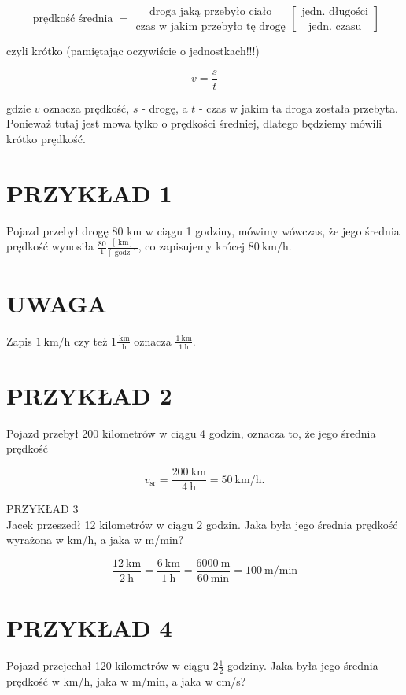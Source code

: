 \documentclass[10pt]{article}
\begin{document}
\[
\text { prędkość średnia }=\frac{\text { droga jaką przebyło ciało }}{\text { czas w jakim przebyło tę drogę }}\left[\frac{\text { jedn. długości }}{\text { jedn. czasu }}\right]
\]

czyli krótko (pamiętając oczywiście o jednostkach!!!)

\[
v=\frac{s}{t}
\]

gdzie \(v\) oznacza prędkość, \(s\) - drogę, a \(t\) - czas w jakim ta droga została przebyta. Ponieważ tutaj jest mowa tylko o prędkości średniej, dlatego będziemy mówili krótko prędkość.

\section*{PRZYKŁAD 1}
Pojazd przebył drogę 80 km w ciągu 1 godziny, mówimy wówczas, że jego średnia prędkość wynosiła \(\frac{80}{1} \frac{[\mathrm{~km}]}{[\operatorname{godz}]}\), co zapisujemy krócej \(80 \mathrm{~km} / \mathrm{h}\).

\section*{UWAGA}
Zapis \(1 \mathrm{~km} / \mathrm{h}\) czy też \(1 \frac{\mathrm{~km}}{\mathrm{~h}}\) oznacza \(\frac{1 \mathrm{~km}}{1 \mathrm{~h}}\).

\section*{PRZYKŁAD 2}
Pojazd przebył 200 kilometrów w ciągu 4 godzin, oznacza to, że jego średnia prędkość

\[
v_{\mathrm{s} \mathrm{r}}=\frac{200 \mathrm{~km}}{4 \mathrm{~h}}=50 \mathrm{~km} / \mathrm{h} .
\]

PRZYKŁAD 3\\
Jacek przeszedł 12 kilometrów w ciągu 2 godzin. Jaka była jego średnia prędkość wyrażona w km/h, a jaka w m/min?

\[
\frac{12 \mathrm{~km}}{2 \mathrm{~h}}=\frac{6 \mathrm{~km}}{1 \mathrm{~h}}=\frac{6000 \mathrm{~m}}{60 \mathrm{~min}}=100 \mathrm{~m} / \mathrm{min}
\]

\section*{PRZYKŁAD 4}
Pojazd przejechał 120 kilometrów w ciągu \(2 \frac{1}{2}\) godziny. Jaka była jego średnia prędkość w km/h, jaka w m/min, a jaka w cm/s?
\end{document}
